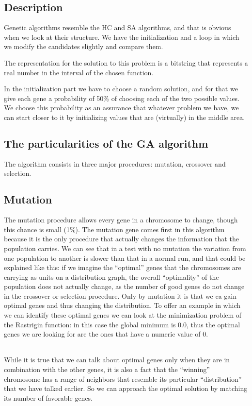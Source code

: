 \documentclass{article}
\begin{document}
\subsection{Description}
Genetic algorithms resemble the HC and SA algorithms, and that is obvious when we look at their structure. We have the initialization and a loop in which we modify the candidates slightly and compare them.

The representation for the solution to this problem is a bitstring that represents a real number in the interval of the chosen function.

In the initialization part we have to choose a random solution, and for that we give each gene a probability of 50\% of choosing each of the two possible values. We choose this probability as an assurance that whatever problem we have, we can start closer to it by initializing values that are (virtually) in the middle area.

\subsection{The particularities of the GA algorithm}
The algorithm consists in three major procedures: mutation, crossover and selection.

\subsection{Mutation}
The mutation procedure allows every gene in a chromosome to change, though this chance is small (1\%). The mutation gene comes first in this algorithm because it is the only procedure that actually changes the information that the population carries. We can see that in a test with no mutation the variation from one population to another is slower than that in a normal run, and that could be explained like this: if we imagine the “optimal” genes that the chromosomes are carrying as units on a distribution graph, the overall “optimality” of the population does not actually change, as the number of good genes do not change in the crossover or selection procedure. Only by mutation it is that we ca gain optimal genes and thus changing the distribution. To offer an example in which we can identify these optimal genes we can look at the minimization problem of the Rastrigin function: in this case the global minimum is 0.0, thus the optimal genes we are looking for are the ones that have a numeric value of 0. \\\\
\par While it is true that we can talk about optimal genes only when they are in combination with the other genes, it is also a fact that the “winning” chromosome has a range of neighbors that resemble its particular “distribution” that we have talked earlier. So we can approach the optimal solution by matching its number of favorable genes.
\end{document}
